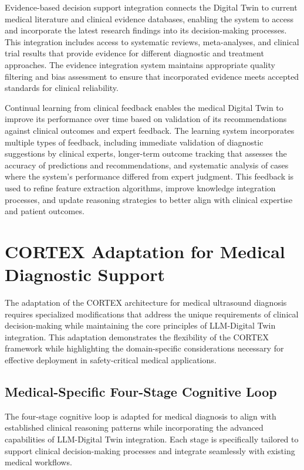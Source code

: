 Evidence-based decision support integration connects the Digital Twin to current medical literature and clinical evidence databases, enabling the system to access and incorporate the latest research findings into its decision-making processes. This integration includes access to systematic reviews, meta-analyses, and clinical trial results that provide evidence for different diagnostic and treatment approaches. The evidence integration system maintains appropriate quality filtering and bias assessment to ensure that incorporated evidence meets accepted standards for clinical reliability.

Continual learning from clinical feedback enables the medical Digital Twin to improve its performance over time based on validation of its recommendations against clinical outcomes and expert feedback. The learning system incorporates multiple types of feedback, including immediate validation of diagnostic suggestions by clinical experts, longer-term outcome tracking that assesses the accuracy of predictions and recommendations, and systematic analysis of cases where the system's performance differed from expert judgment. This feedback is used to refine feature extraction algorithms, improve knowledge integration processes, and update reasoning strategies to better align with clinical expertise and patient outcomes.

\section{CORTEX Adaptation for Medical Diagnostic Support}

The adaptation of the CORTEX architecture for medical ultrasound diagnosis requires specialized modifications that address the unique requirements of clinical decision-making while maintaining the core principles of LLM-Digital Twin integration. This adaptation demonstrates the flexibility of the CORTEX framework while highlighting the domain-specific considerations necessary for effective deployment in safety-critical medical applications.

\subsection{Medical-Specific Four-Stage Cognitive Loop}

The four-stage cognitive loop is adapted for medical diagnosis to align with established clinical reasoning patterns while incorporating the advanced capabilities of LLM-Digital Twin integration. Each stage is specifically tailored to support clinical decision-making processes and integrate seamlessly with existing medical workflows.

